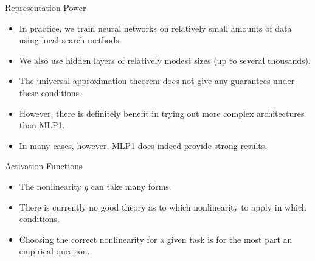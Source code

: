 \documentclass[handout]{beamer}
\begin{document}
\begin{frame}{Representation Power}
\begin{scriptsize}
\begin{itemize}
\item In practice, we train neural networks on relatively small amounts of data using local search methods.
\item We also use hidden layers of relatively modest sizes (up to several thousands). 
\item The universal approximation theorem does not give any guarantees under these conditions.
\item However, there is definitely benefit in trying out more complex architectures than MLP1. 
\item In many cases, however, MLP1 does indeed provide strong results.
\end{itemize}


\end{scriptsize}
\end{frame}








\begin{frame}{Activation Functions}
\begin{scriptsize}
\begin{itemize}
\item The nonlinearity $g$ can take many forms. 
\item There is currently no good theory as to which nonlinearity to apply in which conditions.
\item Choosing the correct nonlinearity for a given task is for the most part an empirical question.
\end{itemize}
\end{scriptsize}
\end{frame}
\end{document}
